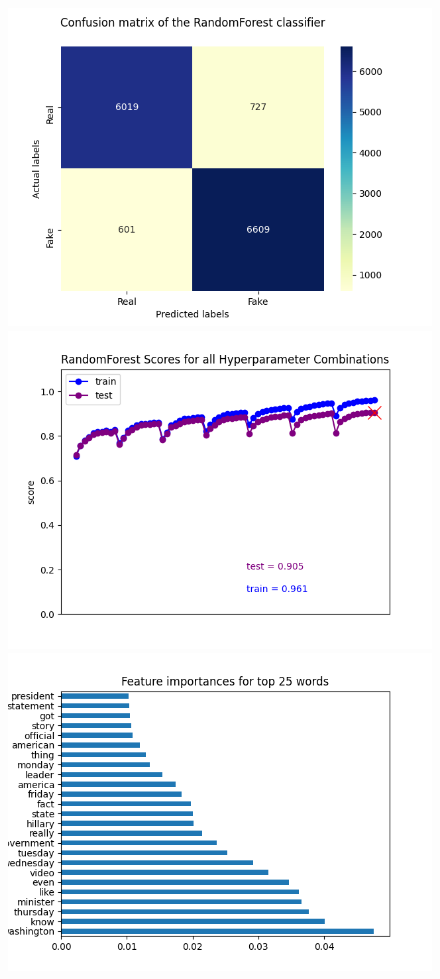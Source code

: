 \documentclass[10pt,twocolumn,letterpaper]{article}
\begin{document}
\begin{figure}[h]
   \begin{center}
        \includegraphics[scale=0.6]{graphs/RF/confusion_matrix.png}
        \includegraphics[scale=0.6]{graphs/RF/scores_plot.png}
        \includegraphics[scale=0.6]{graphs/RF/feature_importances.png}
   \end{center}
        \vspace*{-5mm}
        \caption{\label{Third_figure}}
\end{figure}
\end{document}
